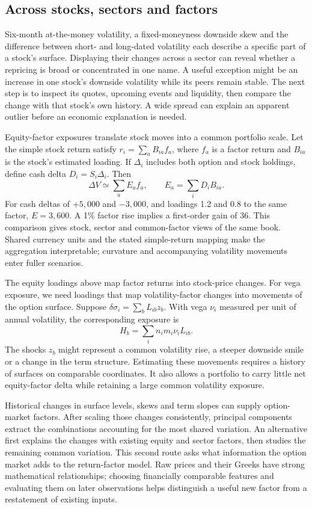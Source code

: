 \documentclass[8pt]{strategynet-journal}
\begin{document}
\begin{SNcolumns}
\section{Across stocks, sectors and factors}
Six-month at-the-money volatility,
a fixed-moneyness downside skew and the difference between short- and
long-dated volatility each describe a specific part of a stock's surface.
Displaying their changes across a sector can reveal whether a repricing is
broad or concentrated in one name. A useful exception might be an increase in
one stock's downside volatility while its peers remain stable. The next step
is to inspect its quotes, upcoming events and liquidity, then compare the
change with that stock's own history. A wide spread can explain an apparent
outlier before an economic explanation is needed.

Equity-factor exposures translate stock moves into a common portfolio scale.
Let the simple stock return satisfy $r_i=\sum_a B_{ia}f_a$, where $f_a$ is a
factor return and $B_{ia}$ is the stock's estimated loading. If $\Delta_i$ includes
both option and stock holdings, define cash delta $D_i=S_i\Delta_i$. Then
\[
 \Delta V\simeq\sum_a E_a f_a,\qquad
 E_a=\sum_i D_i B_{ia}.
\]
For cash deltas of $+5{,}000$ and $-3{,}000$, and loadings 1.2 and 0.8 to the same
factor, $E=3{,}600$. A 1\% factor rise implies a first-order gain of 36. This
comparison gives stock, sector and common-factor views of the same book. Shared
currency units and the stated simple-return mapping make the aggregation
interpretable; curvature and accompanying volatility movements enter fuller
scenarios.

The equity loadings above map factor returns into stock-price changes.
For vega exposure, we need loadings that map volatility-factor changes into
movements of the option surface. Suppose
$\delta\sigma_i=\sum_b L_{ib}z_b$. With vega $\nu_i$ measured per unit of annual
volatility, the corresponding exposure is
\[
 H_b=\sum_i n_i m_i\nu_i L_{ib}.
\]
The shocks $z_b$ might represent a common volatility rise, a steeper downside
smile or a change in the term structure. Estimating these movements requires a
history of surfaces on comparable coordinates. It also allows a portfolio to
carry little net equity-factor delta while retaining a large common volatility
exposure.

Historical changes in surface levels, skews and term slopes can supply
option-market factors. After scaling those changes consistently, principal
components extract the combinations accounting for the most shared variation.
An alternative first explains the changes with existing equity and sector
factors, then studies the remaining common variation. This second route
asks what information the option market adds to the return-factor model.
Raw prices and their Greeks have strong mathematical relationships; choosing
financially comparable features and evaluating them on later observations
helps distinguish a useful new factor from a restatement of existing inputs.


\end{SNcolumns}
\end{document}

